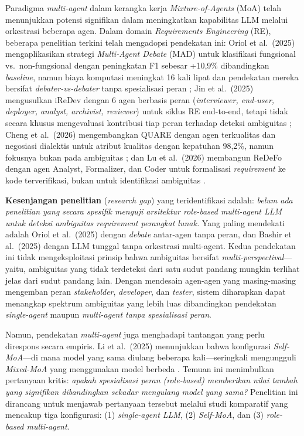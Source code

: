 Paradigma \textit{multi-agent} dalam kerangka kerja \textit{Mixture-of-Agents} (MoA) \cite{wang2024moa} telah menunjukkan potensi signifikan dalam meningkatkan kapabilitas LLM melalui orkestrasi beberapa agen. Dalam domain \textit{Requirements Engineering} (RE), beberapa penelitian terkini telah mengadopsi pendekatan ini: Oriol et al.\ (2025) mengaplikasikan strategi \textit{Multi-Agent Debate} (MAD) untuk klasifikasi fungsional vs.\ non-fungsional dengan peningkatan F1 sebesar +10,9\% dibandingkan \textit{baseline}, namun biaya komputasi meningkat 16 kali lipat dan pendekatan mereka bersifat \textit{debater-vs-debater} tanpa spesialisasi peran \cite{oriol2025}; Jin et al.\ (2025) mengusulkan iReDev dengan 6 agen berbasis peran (\textit{interviewer, end-user, deployer, analyst, archivist, reviewer}) untuk siklus RE end-to-end, tetapi tidak secara khusus mengevaluasi kontribusi tiap peran terhadap deteksi ambiguitas \cite{jin2025}; Cheng et al.\ (2026) mengembangkan QUARE dengan agen terkualitas dan negosiasi dialektis untuk atribut kualitas dengan kepatuhan 98,2\%, namun fokusnya bukan pada ambiguitas \cite{cheng2026}; dan Lu et al.\ (2026) membangun ReDeFo dengan agen Analyst, Formalizer, dan Coder untuk formalisasi \textit{requirement} ke kode terverifikasi, bukan untuk identifikasi ambiguitas \cite{lu2026}.

\textbf{Kesenjangan penelitian} (\textit{research gap}) yang teridentifikasi adalah: \textit{belum ada penelitian yang secara spesifik menguji arsitektur role-based multi-agent LLM untuk deteksi ambiguitas requirement perangkat lunak.} Yang paling mendekati adalah Oriol et al.\ (2025) dengan \textit{debate} antar-agen tanpa peran, dan Bashir et al.\ (2025) dengan LLM tunggal tanpa orkestrasi multi-agent. Kedua pendekatan ini tidak mengeksploitasi prinsip bahwa ambiguitas bersifat \textit{multi-perspectival}—yaitu, ambiguitas yang tidak terdeteksi dari satu sudut pandang mungkin terlihat jelas dari sudut pandang lain. Dengan mendesain agen-agen yang masing-masing mengemban peran \textit{stakeholder}, \textit{developer}, dan \textit{tester}, sistem diharapkan dapat menangkap spektrum ambiguitas yang lebih luas dibandingkan pendekatan \textit{single-agent} maupun \textit{multi-agent tanpa spesialisasi peran}.

Namun, pendekatan \textit{multi-agent} juga menghadapi tantangan yang perlu direspons secara empiris. Li et al.\ (2025) menunjukkan bahwa konfigurasi \textit{Self-MoA}—di mana model yang sama diulang beberapa kali—seringkali mengungguli \textit{Mixed-MoA} yang menggunakan model berbeda \cite{lismoa2025}. Temuan ini menimbulkan pertanyaan kritis: \textit{apakah spesialisasi peran (role-based) memberikan nilai tambah yang signifikan dibandingkan sekadar mengulang model yang sama?} Penelitian ini dirancang untuk menjawab pertanyaan tersebut melalui studi komparatif yang mencakup tiga konfigurasi: (1) \textit{single-agent LLM}, (2) \textit{Self-MoA}, dan (3) \textit{role-based multi-agent}.

